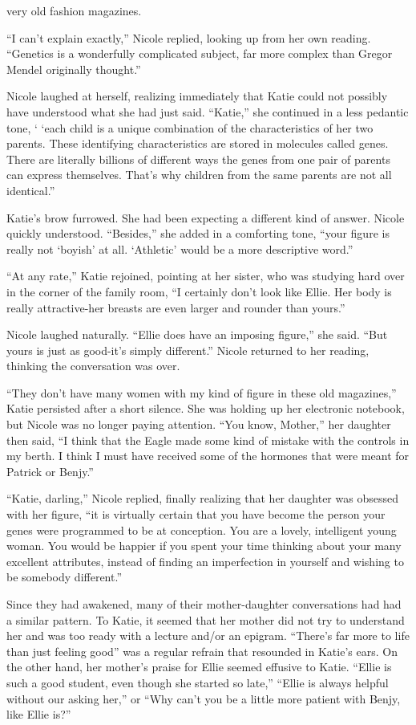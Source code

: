 \documentclass[]{article}
\begin{document}
{very old fashion magazines.

“I can’t explain exactly,” Nicole replied, looking up from her own reading. “Genetics is a wonderfully complicated subject, far more complex than Gregor Mendel originally thought.”

Nicole laughed at herself, realizing immediately that Katie could not possibly have understood what she had just said. “Katie,” she continued in a less pedantic tone, ‘ ‘each child is a unique combination of the characteristics of her two parents. These identifying characteristics are stored in molecules called genes. There are literally billions of different ways the genes from one pair of parents can express themselves. That’s why children from the same parents are not all identical.”

Katie’s brow furrowed. She had been expecting a different kind of answer. Nicole quickly understood. “Besides,” she added in a comforting tone, “your figure is really not ‘boyish’ at all. ‘Athletic’ would be a more descriptive word.”

“At any rate,” Katie rejoined, pointing at her sister, who was studying hard over in the corner of the family room, “I certainly don’t look like Ellie. Her body is really attractive-her breasts are even larger and rounder than yours.”

Nicole laughed naturally. “Ellie does have an imposing figure,” she said. “But yours is just as good-it’s simply different.” Nicole returned to her reading, thinking the conversation was over.

“They don’t have many women with my kind of figure in these old magazines,” Katie persisted after a short silence. She was holding up her electronic notebook, but Nicole was no longer paying attention. “You know, Mother,” her daughter then said, “I think that the Eagle made some kind of mistake with the controls in my berth. I think I must have received some of the hormones that were meant for Patrick or Benjy.”

“Katie, darling,” Nicole replied, finally realizing that her daughter was obsessed with her figure, “it is virtually certain that you have become the person your genes were programmed to be at conception. You are a lovely, intelligent young woman. You would be happier if you spent your time thinking about your many excellent attributes, instead of finding an imperfection in yourself and wishing to be somebody different.”

Since they had awakened, many of their mother-daughter conversations had had a similar pattern. To Katie, it seemed that her mother did not try to understand her and was too ready with a lecture and/or an epigram. “There’s far more to life than just feeling good” was a regular refrain that resounded in Katie’s ears. On the other hand, her mother’s praise for Ellie seemed effusive to Katie. “Ellie is such a good student, even though she started so late,” “Ellie is always helpful without our asking her,” or “Why can’t you be a little more patient with Benjy, like Ellie is?”

}
\end{document}

